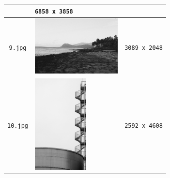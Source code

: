 \begin{longtable}{|c|p{5.5cm}|c|}
\begin{minipage}{.3\textwidth}
  \end{minipage} & \texttt{6858 x 3858} \\ \hline
  \texttt{9.jpg} & \begin{minipage}{.3\textwidth}
    \includegraphics[height=3cm]{chapters/res/appendix-5/9.jpg}
  \end{minipage} & \texttt{3089 x 2048} \\ \hline
  \texttt{10.jpg} & \begin{minipage}{.3\textwidth}
    \includegraphics[height=5cm]{chapters/res/appendix-5/10.jpg}
  \end{minipage} & \texttt{2592 x 4608} \\ \hline
\end{longtable}
